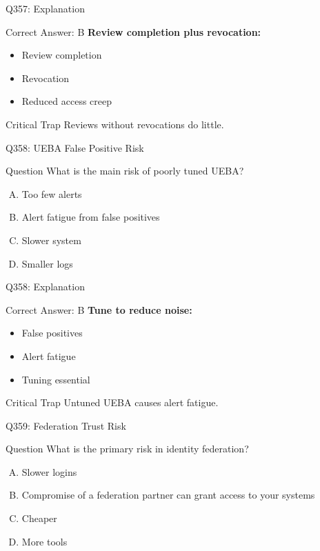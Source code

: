 \documentclass{beamer}
\begin{document}
	\begin{frame}{Q357: Explanation}
		\begin{block}{Correct Answer: B}
			\textbf{Review completion plus revocation:}
			\begin{itemize}
				\item Review completion
				\item Revocation
				\item Reduced access creep
			\end{itemize}
		\end{block}
		\begin{alertblock}{Critical Trap}
			Reviews without revocations do little.
		\end{alertblock}
	\end{frame}
	
	\begin{frame}{Q358: UEBA False Positive Risk}
		\begin{block}{Question}
			What is the main risk of poorly tuned UEBA?
		\end{block}
		\begin{enumerate}[(A)]
			\item Too few alerts
			\item Alert fatigue from false positives
			\item Slower system
			\item Smaller logs
		\end{enumerate}
	\end{frame}
	
	\begin{frame}{Q358: Explanation}
		\begin{block}{Correct Answer: B}
			\textbf{Tune to reduce noise:}
			\begin{itemize}
				\item False positives
				\item Alert fatigue
				\item Tuning essential
			\end{itemize}
		\end{block}
		\begin{alertblock}{Critical Trap}
			Untuned UEBA causes alert fatigue.
		\end{alertblock}
	\end{frame}
	
	\begin{frame}{Q359: Federation Trust Risk}
		\begin{block}{Question}
			What is the primary risk in identity federation?
		\end{block}
		\begin{enumerate}[(A)]
			\item Slower logins
			\item Compromise of a federation partner can grant access to your systems
			\item Cheaper
			\item More tools
		\end{enumerate}
	\end{frame}
	
\end{document}
